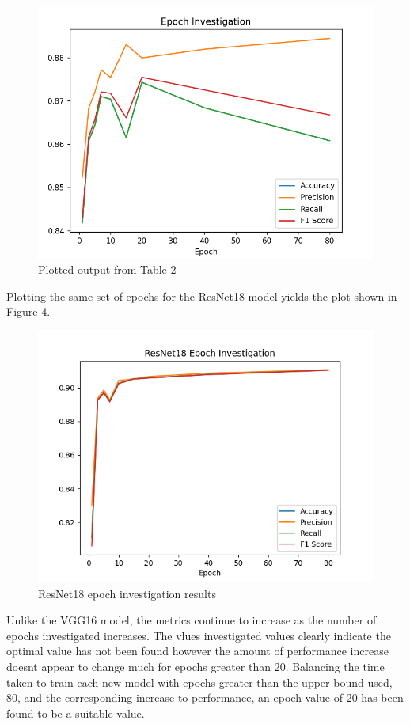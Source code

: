 \documentclass[10pt,twocolumn,letterpaper]{article}
\begin{document}
\begin{center}
\begin{figure}[H]
\includegraphics[scale=0.6]{epochinvestigation.PNG}
\caption{Plotted output from Table 2}
\end{figure}
\end{center}
Plotting the same set of epochs for the ResNet18 model yields the plot shown in Figure 4.
\begin{center}
   \begin{figure}[H]
   \includegraphics[scale=0.6]{resnet18epoch.png}
   \caption{ResNet18 epoch investigation results}
   \end{figure}
   \end{center}
Unlike the VGG16 model, the metrics continue to increase as the number of epochs investigated 
increases. The vlues investigated values clearly indicate the optimal value has not been found 
however the amount of performance increase doesnt appear to change much for epochs greater 
than 20. Balancing the time taken to train each new model with epochs greater 
than the upper bound used, 80, and the corresponding increase to performance, an epoch 
value of 20 has been found to be a suitable value. 
\end{document}
